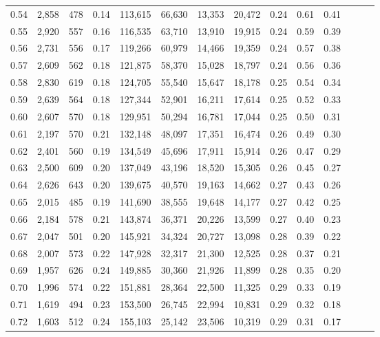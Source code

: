 \begin{tabular}{rrrrrrrrrrrrrr}
0.54 &  2,858 &  478 &  0.14 &  113,615 &   66,630 &  13,353 &  20,472 &  0.24 &  0.61 &      0.41 \\
0.55 &  2,920 &  557 &  0.16 &  116,535 &   63,710 &  13,910 &  19,915 &  0.24 &  0.59 &      0.39 \\
0.56 &  2,731 &  556 &  0.17 &  119,266 &   60,979 &  14,466 &  19,359 &  0.24 &  0.57 &      0.38 \\
0.57 &  2,609 &  562 &  0.18 &  121,875 &   58,370 &  15,028 &  18,797 &  0.24 &  0.56 &      0.36 \\
0.58 &  2,830 &  619 &  0.18 &  124,705 &   55,540 &  15,647 &  18,178 &  0.25 &  0.54 &      0.34 \\
0.59 &  2,639 &  564 &  0.18 &  127,344 &   52,901 &  16,211 &  17,614 &  0.25 &  0.52 &      0.33 \\
0.60 &  2,607 &  570 &  0.18 &  129,951 &   50,294 &  16,781 &  17,044 &  0.25 &  0.50 &      0.31 \\
0.61 &  2,197 &  570 &  0.21 &  132,148 &   48,097 &  17,351 &  16,474 &  0.26 &  0.49 &      0.30 \\
0.62 &  2,401 &  560 &  0.19 &  134,549 &   45,696 &  17,911 &  15,914 &  0.26 &  0.47 &      0.29 \\
0.63 &  2,500 &  609 &  0.20 &  137,049 &   43,196 &  18,520 &  15,305 &  0.26 &  0.45 &      0.27 \\
0.64 &  2,626 &  643 &  0.20 &  139,675 &   40,570 &  19,163 &  14,662 &  0.27 &  0.43 &      0.26 \\
0.65 &  2,015 &  485 &  0.19 &  141,690 &   38,555 &  19,648 &  14,177 &  0.27 &  0.42 &      0.25 \\
0.66 &  2,184 &  578 &  0.21 &  143,874 &   36,371 &  20,226 &  13,599 &  0.27 &  0.40 &      0.23 \\
0.67 &  2,047 &  501 &  0.20 &  145,921 &   34,324 &  20,727 &  13,098 &  0.28 &  0.39 &      0.22 \\
0.68 &  2,007 &  573 &  0.22 &  147,928 &   32,317 &  21,300 &  12,525 &  0.28 &  0.37 &      0.21 \\
0.69 &  1,957 &  626 &  0.24 &  149,885 &   30,360 &  21,926 &  11,899 &  0.28 &  0.35 &      0.20 \\
0.70 &  1,996 &  574 &  0.22 &  151,881 &   28,364 &  22,500 &  11,325 &  0.29 &  0.33 &      0.19 \\
0.71 &  1,619 &  494 &  0.23 &  153,500 &   26,745 &  22,994 &  10,831 &  0.29 &  0.32 &      0.18 \\
0.72 &  1,603 &  512 &  0.24 &  155,103 &   25,142 &  23,506 &  10,319 &  0.29 &  0.31 &      0.17 \\

\end{tabular}
